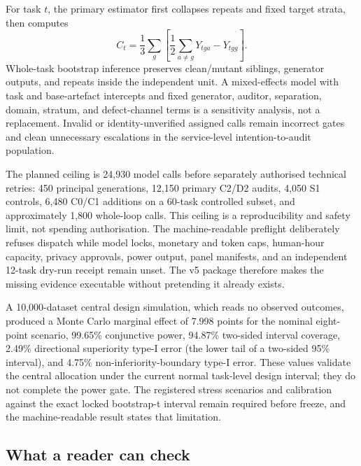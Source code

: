 \documentclass[11pt]{article}
\begin{document}
For task $t$, the primary estimator first collapses repeats and fixed target strata, then computes
\begin{equation}
C_t=\frac{1}{3}\sum_g\left[\frac{1}{2}\sum_{a\neq g}Y_{tga}-Y_{tgg}\right].
\end{equation}
Whole-task bootstrap inference preserves clean/mutant siblings, generator outputs, and repeats inside the independent unit. A mixed-effects model with task and base-artefact intercepts and fixed generator, auditor, separation, domain, stratum, and defect-channel terms is a sensitivity analysis, not a replacement. Invalid or identity-unverified assigned calls remain incorrect gates and clean unnecessary escalations in the service-level intention-to-audit population.

The planned ceiling is 24,930 model calls before separately authorised technical retries: 450 principal generations, 12,150 primary C2/D2 audits, 4,050 S1 controls, 6,480 C0/C1 additions on a 60-task controlled subset, and approximately 1,800 whole-loop calls. This ceiling is a reproducibility and safety limit, not spending authorisation. The machine-readable preflight deliberately refuses dispatch while model locks, monetary and token caps, human-hour capacity, privacy approvals, power output, panel manifests, and an independent 12-task dry-run receipt remain unset. The v5 package therefore makes the missing evidence executable without pretending it already exists.

A 10,000-dataset central design simulation, which reads no observed outcomes, produced a Monte Carlo marginal effect of 7.998 points for the nominal eight-point scenario, 99.65\% conjunctive power, 94.87\% two-sided interval coverage, 2.49\% directional superiority type-I error (the lower tail of a two-sided 95\% interval), and 4.75\% non-inferiority-boundary type-I error. These values validate the central allocation under the current normal task-level design interval; they do not complete the power gate. The registered stress scenarios and calibration against the exact locked bootstrap-t interval remain required before freeze, and the machine-readable result states that limitation.

\FloatBarrier

\subsection{What a reader can check}\label{sec:artefacts}
\end{document}
